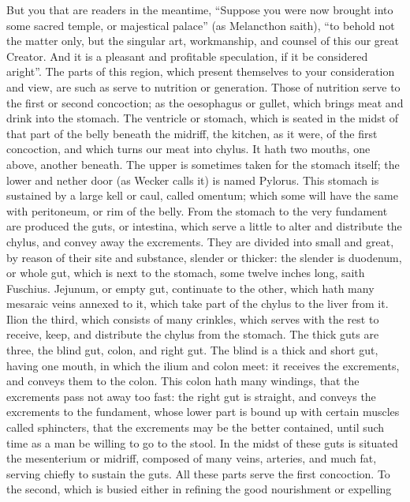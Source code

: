 But you that are readers in the meantime, \enquote{Suppose you were now brought into
some sacred temple, or majestical palace} (as Melancthon
saith), \enquote{to behold not the matter only, but the singular art, workmanship, and
counsel of this our great Creator. And it is a pleasant and profitable
speculation, if it be considered aright}. The parts of this region, which
present themselves to your consideration and view, are such as serve to
nutrition or generation. Those of nutrition serve to the first or second
concoction; as the oesophagus or gullet, which brings meat and drink into the
stomach. The ventricle or stomach, which is seated in the midst of that part of
the belly beneath the midriff, the kitchen, as it were, of the first
concoction, and which turns our meat into chylus. It hath two mouths, one
above, another beneath. The upper is sometimes taken for the stomach itself;
the lower and nether door (as Wecker calls it) is named Pylorus. This stomach
is sustained by a large kell or caul, called omentum; which some will have the
same with peritoneum, or rim of the belly. From the stomach to the very
fundament are produced the guts, or intestina, which serve a little to alter
and distribute the chylus, and convey away the excrements. They are divided
into small and great, by reason of their site and substance, slender or
thicker: the slender is duodenum, or whole gut, which is next to the stomach,
some twelve inches long, saith Fuschius. Jejunum, or empty
gut, continuate to the other, which hath many mesaraic veins annexed to it,
which take part of the chylus to the liver from it. Ilion the third, which
consists of many crinkles, which serves with the rest to receive, keep, and
distribute the chylus from the stomach. The thick guts are three, the blind
gut, colon, and right gut. The blind is a thick and short gut, having one
mouth, in which the ilium and colon meet: it receives the excrements, and
conveys them to the colon. This colon hath many windings, that the excrements
pass not away too fast: the right gut is straight, and conveys the excrements
to the fundament, whose lower part is bound up with certain muscles called
sphincters, that the excrements may be the better contained, until such time as
a man be willing to go to the stool. In the midst of these guts is situated the
mesenterium or midriff, composed of many veins, arteries, and much fat, serving
chiefly to sustain the guts. All these parts serve the first concoction. To the
second, which is busied either in refining the good nourishment or expelling
